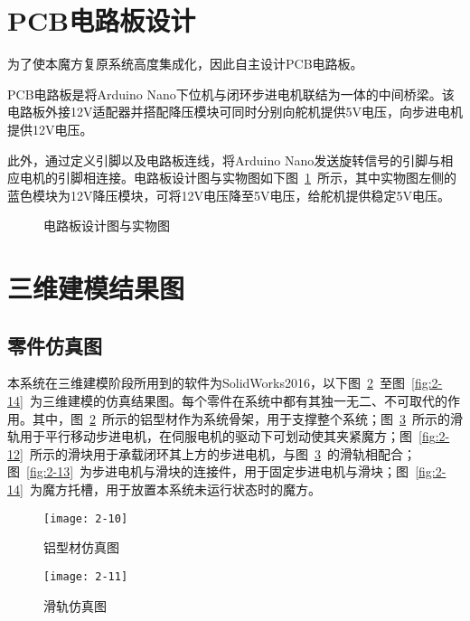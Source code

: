 \section{PCB电路板设计}

为了使本魔方复原系统高度集成化，因此自主设计PCB电路板。

PCB电路板是将Arduino Nano下位机与闭环步进电机联结为一体的中间桥梁。该电路板外接12V适配器并搭配降压模块可同时分别向舵机提供5V电压，向步进电机提供12V电压。

此外，通过定义引脚以及电路板连线，将Arduino Nano发送旋转信号的引脚与相应电机的引脚相连接。电路板设计图与实物图如下图~\ref{fig:2-9}~所示，其中实物图左侧的蓝色模块为12V降压模块，可将12V电压降至5V电压，给舵机提供稳定5V电压。

\begin{figure}[H]
	\centering
	\subfigure[电路板设计图]{\label{fig:subfig:2-9}
		\texttt{[image: 2-9]}}
	\subfigure[电路板实物图]{\label{fig:subfig:2-9.1}
		\texttt{[image: 2-9.1]}}
	\caption{电路板设计图与实物图}\label{fig:2-9}
\end{figure}

\section{三维建模结果图}

\subsection{零件仿真图}

本系统在三维建模阶段所用到的软件为SolidWorks2016，以下图~\ref{fig:2-10}~至图~\ref{fig:2-14}~为三维建模的仿真结果图。每个零件在系统中都有其独一无二、不可取代的作用。其中，图~\ref{fig:2-10}~所示的铝型材作为系统骨架，用于支撑整个系统；图~\ref{fig:2-11}~所示的滑轨用于平行移动步进电机，在伺服电机的驱动下可划动使其夹紧魔方；图~\ref{fig:2-12}~所示的滑块用于承载闭环其上方的步进电机，与图~\ref{fig:2-11}~的滑轨相配合；图~\ref{fig:2-13}~为步进电机与滑块的连接件，用于固定步进电机与滑块；图~\ref{fig:2-14}~为魔方托槽，用于放置本系统未运行状态时的魔方。

\begin{figure}[H]
	\centering
	\texttt{[image: 2-10]}
	\caption{铝型材仿真图}\label{fig:2-10}
\end{figure}

\begin{figure}[H]
	\centering
	\texttt{[image: 2-11]}
	\caption{滑轨仿真图}\label{fig:2-11}
\end{figure}

